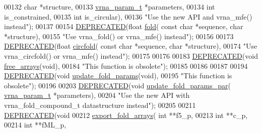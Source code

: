 \begin{DoxyCode}
00132           \textcolor{keywordtype}{char} *structure,
00133           \mbox{\hyperlink{group__energy__parameters_structvrna__param__s}{vrna\_param\_t}} *parameters,
00134           \textcolor{keywordtype}{int} is\_constrained,
00135           \textcolor{keywordtype}{int} is\_circular),
00136 \textcolor{stringliteral}{"Use the new API and vrna\_mfe() instead"});
00137 
00154 \mbox{\hyperlink{fold_8h_aab347a3c03fbe8e7319551b9fa0cce4a}{DEPRECATED}}(\textcolor{keywordtype}{float} \mbox{\hyperlink{group__mfe__fold__single_gaadafcb0f140795ae62e5ca027e335a9b}{fold}}( \textcolor{keyword}{const} \textcolor{keywordtype}{char} *sequence, \textcolor{keywordtype}{char} *structure),
00155 \textcolor{stringliteral}{"Use vrna\_fold() or vrna\_mfe() instead"});
00156 
00173 \mbox{\hyperlink{fold_8h_aab347a3c03fbe8e7319551b9fa0cce4a}{DEPRECATED}}(\textcolor{keywordtype}{float} \mbox{\hyperlink{group__mfe__fold__single_ga4ac63ab3e8d9a80ced28b8052d94e423}{circfold}}( \textcolor{keyword}{const} \textcolor{keywordtype}{char} *sequence, \textcolor{keywordtype}{char} *structure),
00174 \textcolor{stringliteral}{"Use vrna\_circfold() or vrna\_mfe() instead"});
00175 
00176 
00183 \mbox{\hyperlink{fold_8h_aab347a3c03fbe8e7319551b9fa0cce4a}{DEPRECATED}}(\textcolor{keywordtype}{void} \mbox{\hyperlink{group__mfe__fold__single_ga107fdfe5fd641868156bfd849f6866c7}{free\_arrays}}(\textcolor{keywordtype}{void}),
00184 \textcolor{stringliteral}{"This function is obsolete"});
00185 
00186 
00187 
00194 \mbox{\hyperlink{fold_8h_aab347a3c03fbe8e7319551b9fa0cce4a}{DEPRECATED}}(\textcolor{keywordtype}{void} \mbox{\hyperlink{group__mfe__fold__single_ga41bf8f6fa15b94471f7095cad9f0ccf3}{update\_fold\_params}}(\textcolor{keywordtype}{void}),
00195 \textcolor{stringliteral}{"This function is obsolete"});
00196 
00203 \mbox{\hyperlink{fold_8h_aab347a3c03fbe8e7319551b9fa0cce4a}{DEPRECATED}}(\textcolor{keywordtype}{void} \mbox{\hyperlink{group__mfe__fold__single_gae66dc422efb8f5d56717d92d6002a9f8}{update\_fold\_params\_par}}(
      \mbox{\hyperlink{group__energy__parameters_structvrna__param__s}{vrna\_param\_t}} *parameters),
00204 \textcolor{stringliteral}{"Use the new API with vrna\_fold\_compound\_t datastructure instead"});
00205 
00211 \mbox{\hyperlink{fold_8h_aab347a3c03fbe8e7319551b9fa0cce4a}{DEPRECATED}}(\textcolor{keywordtype}{void}
00212 \mbox{\hyperlink{group__mfe__fold__single_ga99641b8dbb40891da5490d3cc271e607}{export\_fold\_arrays}}( \textcolor{keywordtype}{int} **f5\_p,
00213                     \textcolor{keywordtype}{int} **c\_p,
00214                     \textcolor{keywordtype}{int} **fML\_p,

\end{DoxyCode}

